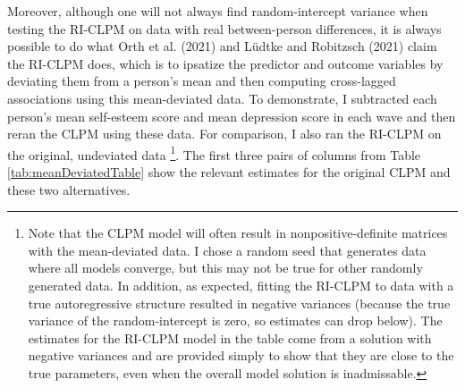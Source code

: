 \documentclass[
  english,
  man,floatsintext]{apa6}
\begin{document}
Moreover, although one will not always find random-intercept variance when testing the RI-CLPM on data with real between-person differences, it is always possible to do what Orth et al. (2021) and Lüdtke and Robitzsch (2021) claim the RI-CLPM does, which is to ipsatize the predictor and outcome variables by deviating them from a person's mean and then computing cross-lagged associations using this mean-deviated data. To demonstrate, I subtracted each person's mean self-esteem score and mean depression score in each wave and then reran the CLPM using these data. For comparison, I also ran the RI-CLPM on the original, undeviated data \footnote{Note that the CLPM model will often result in nonpositive-definite matrices with the mean-deviated data. I chose a random seed that generates data where all models converge, but this may not be true for other randomly generated data. In addition, as expected, fitting the RI-CLPM to data with a true autoregressive structure resulted in negative variances (because the true variance of the random-intercept is zero, so estimates can drop below). The estimates for the RI-CLPM model in the table come from a solution with negative variances and are provided simply to show that they are close to the true parameters, even when the overall model solution is inadmissable.}. The first three pairs of columns from Table \ref{tab:meanDeviatedTable} show the relevant estimates for the original CLPM and these two alternatives.
\end{document}
